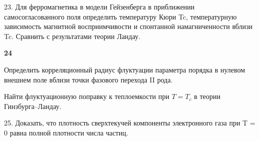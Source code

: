 \documentclass[a4paper,12pt]{article} %
\begin{document}
\begin{ttask}

23. Для ферромагнетика в модели Гейзенберга в приближении самосогласованного поля определить температуру Кюри Tc, 
температурную зависимость магнитной восприимчивости  и спонтанной намагниченности вблизи Tc. 
Сравнить с результатами теории Ландау.





















\end{ttask}



\begin{ttask}  \textbf{24}

Определить корреляционный радиус флуктуации параметра порядка в нулевом внешнем поле вблизи точки фазового перехода II рода. 

Найти флуктуационную поправку к теплоемкости при $ T = T_c $ в теории Гинзбурга–Ландау.



















\end{ttask}





\begin{ttask}

25. Доказать, что плотность сверхтекучей компоненты электронного газа при T = 0 равна полной плотности числа частиц.  

















\end{ttask}
\end{document}
